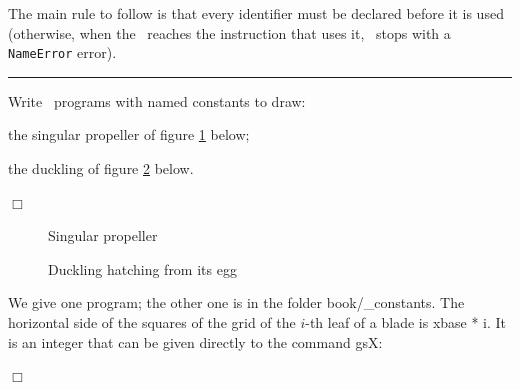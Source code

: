 The main rule to follow is that every identifier must be declared before it is
used (otherwise, when the \robot\ reaches the instruction that uses it, \python\ stops with
a {\tt NameError} error).

\noindent \rule{137mm}{0.1mm}\par\nopagebreak %
\begin{exercice}{Write \python\ programs with named constants
to draw:

\tiret the singular propeller of figure \ref{fig:hesing} below;

\tiret the duckling of figure \ref{fig:canar} below.

\noindent $\Box$}\end{exercice}
\begin{figure}[htbp]
 \caption{Singular propeller}
 \label{fig:hesing}
\end{figure}
\begin{figure}[htbp]
 \caption{Duckling hatching from its egg}
 \label{fig:canar}
\end{figure}
\begin{corrige}{
We give one program; the other one is in the folder {\idt book/\_constants}.
The horizontal side of the squares of the grid of the $i$-th
leaf of a blade is {\idt xbase * i}. It is an integer that can be given
directly to the command {\idt gsX}:

\noindent $\Box$}\end{corrige}
\nopagebreak

\noindent {}

